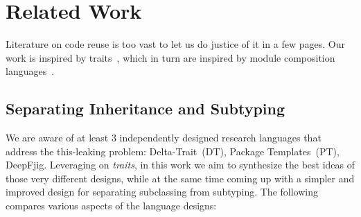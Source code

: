 
\saveSpace\saveSpace
\section{Related Work}
\saveSpace\saveSpace
Literature on code reuse is too vast to let us do justice of it in a few pages.
Our work is inspired by traits~\cite{ducasse2006traits}, which in turn
are inspired by module composition languages~\cite{ancona2002calculus}.
\saveSpace
\subsection{Separating Inheritance and Subtyping}
\saveSpace
We are aware of at least 3 independently designed research languages 
that address the this-leaking problem: Delta-Trait~(DT)\cite{Bettini:2010:ISP:1774088.1774530,BETTINI2013521,Bettini2015282}, Package Templates~(PT)\cite{KrogdahlMS09,DBLP:journals/taosd/AxelsenSKM12,DBLP:conf/gpce/AxelsenK12}, DeepFjig\cite{deep,servetto2014meta,fjig}.
Leveraging on \emph{traits}, in this work we aim to synthesize
the best ideas of those very different designs, while at the same time 
coming up with a simpler and improved design for separating
subclassing from subtyping. The following compares 
various aspects of the language designs:

